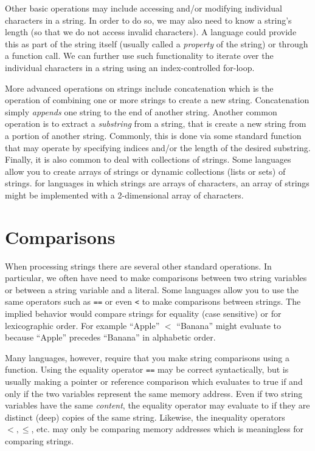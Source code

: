 Other basic operations may include accessing and/or
modifying individual characters in a string.  In order
to do so, we may also need to know a string's length
(so that we do not access invalid characters).  A
language could provide this as part of the string itself
(usually called a \emph{property} of the string) or 
through a function call.  We can further use such functionality
to iterate over the individual characters in a string using
an index-controlled for-loop.

More advanced operations on strings include \gls{concatenation}
which is the operation of combining one or more strings
to create a new string.  Concatenation simply \emph{appends}
one string to the end of another string.  Another common 
operation is to extract a \emph{substring}
from a string, that is create a new string from a portion of
another string.  Commonly, this is done via some standard
function that may operate by specifying indices and/or the
length of the desired substring.  Finally, it is also common 
to deal with collections of strings.  
Some languages allow you to create arrays of strings or 
dynamic collections (lists or sets) of strings.  for languages
in which strings are arrays of characters, an array of strings
might be implemented with a 2-dimensional array of characters.

\section{Comparisons}

When processing strings there are several other standard operations.
In particular, we often have need to make comparisons between
two string variables or between a string variable and a literal.
Some languages allow you to use the same operators such as
\texttt{==} or even \texttt{<} to make comparisons
between strings.  The implied behavior would compare strings for
equality (case sensitive) or for \gls{lexicographic} order.  For example
``Apple'' $<$ ``Banana'' might evaluate to \True because 
``Apple'' precedes ``Banana'' in alphabetic order.

Many languages, however, require that you make string comparisons
using a function.  Using the equality operator \texttt{==} may
be correct syntactically, but is usually making a pointer or 
reference comparison which evaluates to true if and only if the
two variables represent the same memory address.  Even if two
string variables have the same \emph{content}, the equality operator
may evaluate to \False if they are distinct (deep) copies of the
same string.  Likewise, the inequality operators $<, \leq$, etc. may
only be comparing memory addresses which is meaningless
for comparing strings.

